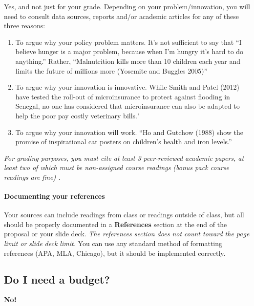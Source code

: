 \documentclass[11pt]{article}
\begin{document}
Yes, and not just for your grade. Depending on your problem/innovation,
you will need to consult data sources, reports and/or academic articles
for any of these three reasons:

\begin{enumerate}
\def\labelenumi{(\arabic{enumi})}
\item
  To argue why your policy problem matters. It's not sufficient to say
  that ``I believe hunger is a major problem, because when I'm hungry
  it's hard to do anything.'' Rather, ``Malnutrition kills more than 10
  children each year and limits the future of millions more (Yosemite
  and Buggles 2005)''
\item
  To argue why your innovation is innovative. While Smith and Patel
  (2012) have tested the roll-out of microinsurance to protect against
  flooding in Senegal, no one has considered that microinsurance can
  also be adapted to help the poor pay costly veterinary bills."
\item
  To argue why your innovation will work. ``Ho and Gutchow (1988) show
  the promise of inspirational cat posters on children's health and iron
  levels.''
\end{enumerate}

\emph{For grading purposes, you must cite at least 3 peer-reviewed
academic papers, at least two of which must be non-assigned course
readings (bonus pack course readings are fine) .}

\hypertarget{documenting-your-references}{%
\paragraph{Documenting your
references}\label{documenting-your-references}}

Your sources can include readings from class or readings outside of
class, but all should be properly documented in a \textbf{References}
section at the end of the proposal or your slide deck. \emph{The
references section does not count toward the page limit or slide deck
limit.} You can use any standard method of formatting references (APA,
MLA, Chicago), but it should be implemented correctly.

\hypertarget{do-i-need-a-budget}{%
\subsection*{Do I need a budget?}\label{do-i-need-a-budget}}

\textbf{No!}
\end{document}
